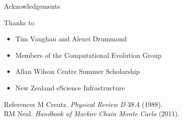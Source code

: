 \documentclass{beamer}
\begin{document}
    \begin{frame}{Acknowledgements}
        \begin{block}{Thanks to}
            \begin{itemize}
                \item Tim Vaughan and Alexei Drummond
                \item Members of the Computational Evolution Group
                \item Allan Wilson Centre Summer Scholarship
                \item New Zealand eScience Infrastructure
            \end{itemize}
        \end{block}
        \begin{block}{References}
            \footnotesize
            M Creutz. \textit{Physical Review D} 38.4 (1988). \texttt{} \\
            RM Neal. \textit{Handbook of Markov Chain Monte Carlo} (2011).
        \end{block}
    \end{frame}
\end{document}
